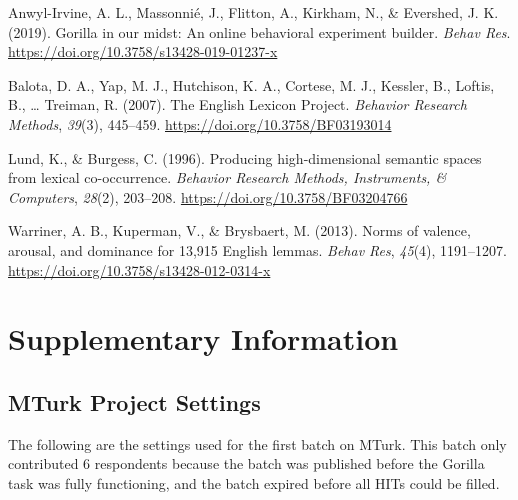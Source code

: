 \documentclass[man]{apa6}
\begin{document}
\begingroup
\setlength{\parindent}{-0.5in}
\setlength{\leftskip}{0.5in}

\hypertarget{refs}{}
\leavevmode\hypertarget{ref-anwyl-irvine_gorilla_2019}{}%
Anwyl-Irvine, A. L., Massonnié, J., Flitton, A., Kirkham, N., \& Evershed, J. K. (2019). Gorilla in our midst: An online behavioral experiment builder. \emph{Behav Res}. \url{https://doi.org/10.3758/s13428-019-01237-x}

\leavevmode\hypertarget{ref-balota_english_2007}{}%
Balota, D. A., Yap, M. J., Hutchison, K. A., Cortese, M. J., Kessler, B., Loftis, B., \ldots{} Treiman, R. (2007). The English Lexicon Project. \emph{Behavior Research Methods}, \emph{39}(3), 445--459. \url{https://doi.org/10.3758/BF03193014}

\leavevmode\hypertarget{ref-lund_producing_1996}{}%
Lund, K., \& Burgess, C. (1996). Producing high-dimensional semantic spaces from lexical co-occurrence. \emph{Behavior Research Methods, Instruments, \& Computers}, \emph{28}(2), 203--208. \url{https://doi.org/10.3758/BF03204766}

\leavevmode\hypertarget{ref-warriner_norms_2013}{}%
Warriner, A. B., Kuperman, V., \& Brysbaert, M. (2013). Norms of valence, arousal, and dominance for 13,915 English lemmas. \emph{Behav Res}, \emph{45}(4), 1191--1207. \url{https://doi.org/10.3758/s13428-012-0314-x}

\endgroup

\newpage

\hypertarget{supplementary-information}{%
\section{Supplementary Information}\label{supplementary-information}}

\hypertarget{mturk-project-settings}{%
\subsection{MTurk Project Settings}\label{mturk-project-settings}}

The following are the settings used for the first batch on MTurk. This batch only contributed 6 respondents because the batch was published before the Gorilla task was fully functioning, and the batch expired before all HITs could be filled.
\end{document}
